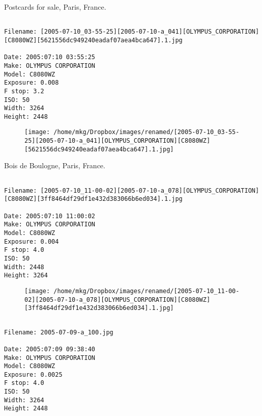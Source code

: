 \clearpage
\onecolumn
\noindent Postcards for sale, Paris, France.
\noindent
\begin{lstlisting}

Filename: [2005-07-10_03-55-25][2005-07-10-a_041][OLYMPUS_CORPORATION][C8080WZ][5621556dc949240eadaf07aea4bca647].1.jpg

Date: 2005:07:10 03:55:25
Make: OLYMPUS CORPORATION
Model: C8080WZ
Exposure: 0.008
F stop: 3.2
ISO: 50
Width: 3264
Height: 2448
\end{lstlisting}
\clearpage

\begin{figure}
\texttt{[image: /home/mkg/Dropbox/images/renamed/[2005-07-10\_03-55-25][2005-07-10-a\_041][OLYMPUS\_CORPORATION][C8080WZ][5621556dc949240eadaf07aea4bca647].1.jpg]}
\end{figure}
    
\clearpage
\onecolumn
\noindent Bois de Boulogne, Paris, France.
\noindent
\begin{lstlisting}

Filename: [2005-07-10_11-00-02][2005-07-10-a_078][OLYMPUS_CORPORATION][C8080WZ][3ff8464df29df1e432d383066b6ed034].1.jpg

Date: 2005:07:10 11:00:02
Make: OLYMPUS CORPORATION
Model: C8080WZ
Exposure: 0.004
F stop: 4.0
ISO: 50
Width: 2448
Height: 3264
\end{lstlisting}
\clearpage

\begin{figure}
\texttt{[image: /home/mkg/Dropbox/images/renamed/[2005-07-10\_11-00-02][2005-07-10-a\_078][OLYMPUS\_CORPORATION][C8080WZ][3ff8464df29df1e432d383066b6ed034].1.jpg]}
\end{figure}
    
\clearpage
\onecolumn
\noindent 
\noindent
\begin{lstlisting}

Filename: 2005-07-09-a_100.jpg

Date: 2005:07:09 09:38:40
Make: OLYMPUS CORPORATION
Model: C8080WZ
Exposure: 0.0025
F stop: 4.0
ISO: 50
Width: 3264
Height: 2448
\end{lstlisting}
\clearpage


